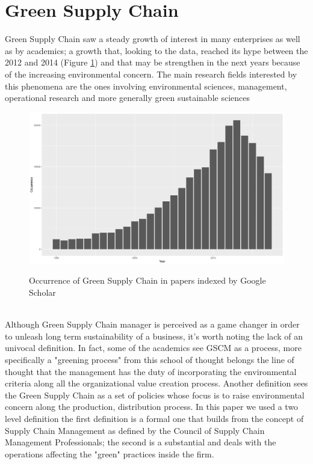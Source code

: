 \documentclass{article}
\begin{document}
\pagebreak

\section{Green Supply Chain}
Green Supply Chain saw a steady growth of interest in many enterprises\cite{Diabat2011} as well as by academics; a growth that, looking to the data\cite{Strobel18}, reached its hype between the 2012 and 2014 (Figure \ref{fig:occurrence}) and that may be strengthen in the next years because of the increasing environmental concern. The main research fields interested by this phenomena are the ones involving environmental sciences, management, operational research and more generally green sustainable sciences\cite{Shan2018}  
\begin{figure}[ht]
	\includegraphics[width=\textwidth]{Images/occurence.png}	
	\label{fig:occurrence}
	\caption{Occurrence of Green Supply Chain in papers indexed by Google Scholar}	
\end{figure}
\\
Although Green Supply Chain manager is perceived as a game changer in order to unleash long term sustainability of a business, it's worth noting the lack of an univocal definition. In fact, some of the academics see GSCM as a process\cite{Gilbert2001}, more specifically a "greening process" from this school of thought belongs the line of thought that the management has the duty of incorporating the environmental criteria along all the organizational value creation process. Another definition sees the Green Supply Chain as a set of policies whose focus is to raise environmental concern along the production, distribution process\cite{Zsidisin2001}. In this paper we used a two level definition the first definition is a formal one that builds from the concept of Supply Chain Management as defined by the Council of Supply Chain Management Professionals; the second is a substantial and deals with the operations affecting the "green" practices inside the firm.
\end{document}
